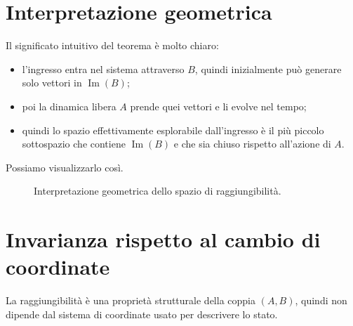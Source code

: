 \section{Interpretazione geometrica}

Il significato intuitivo del teorema è molto chiaro:

\begin{itemize}
    \item l’ingresso entra nel sistema attraverso \(B\), quindi inizialmente può generare solo vettori in \(\operatorname{Im}(B)\);
    \item poi la dinamica libera \(A\) prende quei vettori e li evolve nel tempo;
    \item quindi lo spazio effettivamente esplorabile dall’ingresso è il più piccolo sottospazio che contiene \(\operatorname{Im}(B)\) e che sia chiuso rispetto all’azione di \(A\).
\end{itemize}

Possiamo visualizzarlo così.

\begin{figure}[H]
\centering
{}
\caption{Interpretazione geometrica dello spazio di raggiungibilità.}
\end{figure}

\section{Invarianza rispetto al cambio di coordinate}

La raggiungibilità è una proprietà strutturale della coppia \((A,B)\), quindi non dipende dal sistema di coordinate usato per descrivere lo stato.

